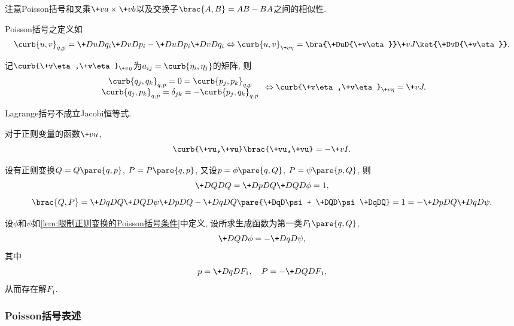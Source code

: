 \documentclass[../TheoreticalMechanics.tex]{subfiles}
\begin{document}
\begin{remark}
    注意Poisson括号和叉乘$\+va\times\+vb$以及交换子$\brac{A,B}=AB-BA$之间的相似性.
\end{remark}
\begin{definition}[Lagrange括号]
    Poisson括号之定义如
    \[ \curb{u,v}_{q,p} = \+DuD{q_i}\+DvD{p_i} - \+DuD{p_i}\+DvD{q_i} \Leftrightarrow \curb{u,v}_{\+v\eta} = \bra{\+DuD{\+v\eta}}\+vJ\ket{\+DvD{\+v\eta}}. \]
\end{definition}
\begin{theorem}[基的Lagrange括号]
        记$\curb{\+v\eta,\+v\eta}_{\+v\eta}$为$a_{ij}=\curb{\eta_i,\eta_j}$的矩阵, 则
        \[ \begin{array}{c}
            \curb{q_j,q_k}_{q,p} = 0 = \curb{p_j,p_k}_{q,p} \\
            \curb{q_j,p_k}_{q,p} = \delta_{jk} = -\curb{p_j,q_k}_{q,p}
        \end{array} \Leftrightarrow \curb{\+v\eta,\+v\eta}_{\+v\eta} = \+vJ. \]
\end{theorem}
\begin{pitfall}
    Lagrange括号不成立Jacobi恒等式.
\end{pitfall}
\begin{theorem}
    对于正则变量的函数$\+vu$,
    \[ \curb{\+vu,\+vu}\brac{\+vu,\+vu} = -\+vI. \]
\end{theorem}
\begin{lemma}[限制正则变换的Poisson括号条件]
    \label{lem:限制正则变换的Poisson括号条件}
    设有正则变换$Q=Q\pare{q,p}$, $P=P\pare{q,p}$, 又设$p=\phi\pare{q,Q}$, $P=\psi\pare{p,Q}$, 则
    \[ \+DQDQ = \+DpDQ\+DQD\phi = 1, \]
    \[ \brac{Q,P} = \+DqDQ\+DQD\psi\+DpDQ - \+DqDQ\pare{\+DqD\psi + \+DQD\psi\+DqDQ} = 1 = -\+DpDQ\+DqD\psi. \]
\end{lemma}
\begin{theorem}[限制正则变换的生成函数存在]
    设$\phi$和$\psi$如\cref{lem:限制正则变换的Poisson括号条件}中定义, 设所求生成函数为第一类$F_1\pare{q,Q}$,
    \[ \+DQD\phi = -\+DqD\psi, \]
    其中
    \[ p = \+DqD{F_1},\quad P = -\+DQD{F_1}, \]
    从而存在解$F_1$.
\end{theorem}


\subsubsection{Poisson括号表述} %
\label{ssub:poisson括号表述}
\end{document}
